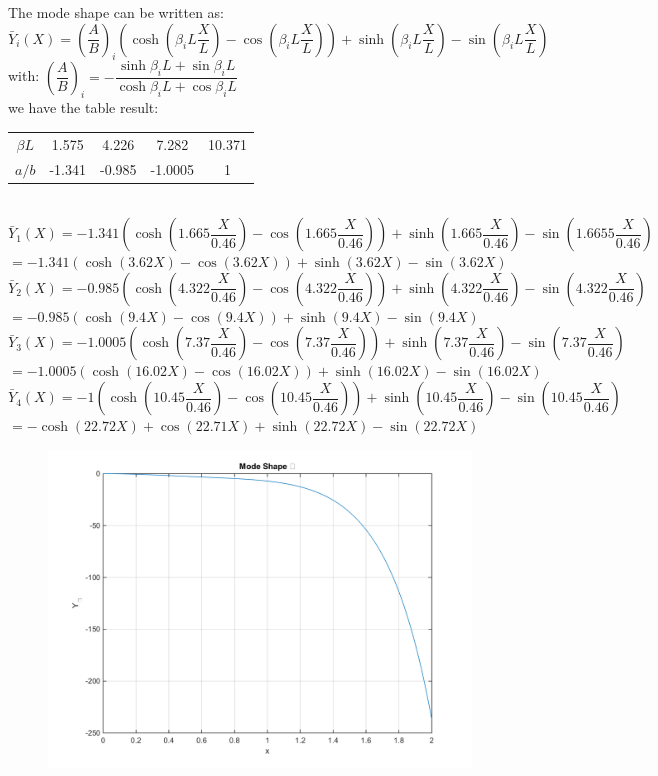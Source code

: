 \documentclass[14pt,a4paper]{article}
\begin{document}
\begin{enumerate}
	The mode shape can be written as:\\
	$\bar{Y}_i(X) = \left(\dfrac{A}{B}\right)_i\left(\cosh(\beta_iL\dfrac{X}{L}) - \cos(\beta_iL\dfrac{X}L)\right) + \sinh(\beta_iL\dfrac{X}{L}) - \sin(\beta_iL\dfrac{X}{L})$\\
	with: 	$\left(\dfrac{A}{B}\right)_i =  -\dfrac{ \sinh\beta_iL + \sin \beta_iL}{\cosh \beta_iL + \cos \beta_iL} $\\
	we have the table result:
	\begin{tabular} {c c c c c}
		$\beta L$ & 1.575 & 4.226 & 7.282 & 10.371 \\
		$a/b$ & -1.341 & -0.985 & -1.0005 & 1
	\end{tabular}\\
	$\bar{Y}_1(X) = -1.341\left(\cosh(1.665\dfrac{X}{0.46}) - \cos(1.665\dfrac{X}{0.46})\right) + \sinh(1.665\dfrac{X}{0.46}) - \sin(1.6655\dfrac{X}{0.46})$\\	
	\hspace*{0.9cm} $= -1.341\left(\cosh(3.62X) - \cos(3.62X)\right) + \sinh(3.62X) - \sin(3.62X)$\\	
	$\bar{Y}_2(X) = -0.985\left(\cosh(4.322\dfrac{X}{0.46}) - \cos(4.322\dfrac{X}{0.46})\right) + \sinh(4.322\dfrac{X}{0.46}) - \sin(4.322\dfrac{X}{0.46})$\\	
	\hspace*{0.9cm} $= -0.985\left(\cosh(9.4X) - \cos(9.4X)\right) + \sinh(9.4X) - \sin(9.4X)$\\
	$\bar{Y}_3(X) = -1.0005\left(\cosh(7.37\dfrac{X}{0.46}) - \cos(7.37\dfrac{X}{0.46})\right) + \sinh(7.37\dfrac{X}{0.46}) - \sin(7.37\dfrac{X}{0.46})$\\	
	\hspace*{0.9cm} $= -1.0005\left(\cosh(16.02X) - \cos(16.02X)\right) + \sinh(16.02X) - \sin(16.02X)$\\
	$\bar{Y}_4(X) = -1\left(\cosh(10.45\dfrac{X}{0.46}) - \cos(10.45\dfrac{X}{0.46})\right) + \sinh(10.45\dfrac{X}{0.46}) - \sin(10.45\dfrac{X}{0.46})$\\	
	\hspace*{0.9cm} $= -\cosh(22.72X) + \cos(22.71X) + \sinh(22.72X) - \sin(22.72X)$\\
	\begin{figure}[htp]
		\centering
		\includegraphics[scale=0.5]{hw2_VB_mode1.png}

\end{figure}
\end{enumerate}
\end{document}
